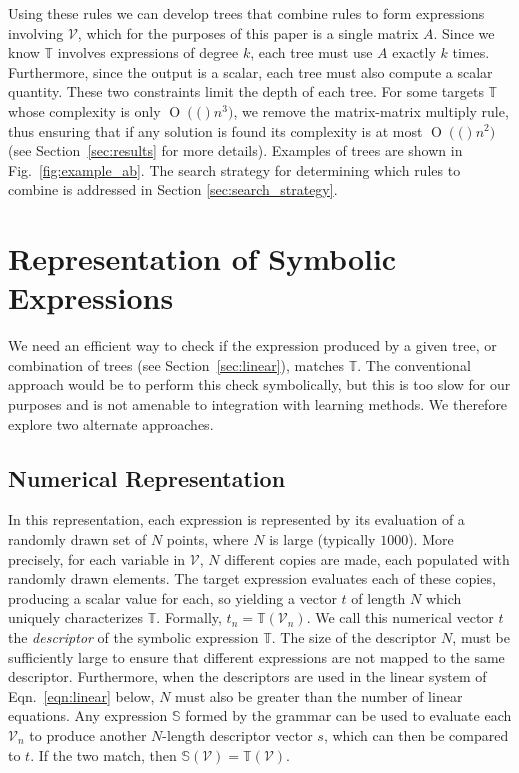 \documentclass{article} %
\newcommand{\eqn}[1]{Eqn.~\ref{eqn:#1}}
\newcommand{\fig}[1]{Fig.~\ref{fig:#1}}
\newcommand{\secc}[1]{Section~\ref{sec:#1}}
\newcommand{\BigO}[1]{\ensuremath{\operatorname{O}\left(#1\right)}}
\begin{document}
Using these rules we can develop trees that combine rules to form
expressions involving $\mathcal{V}$, which for the purposes of this
paper is a single matrix $A$. Since we know $\mathbb{T}$ involves
expressions of degree $k$, each tree must use $A$ exactly $k$
times. Furthermore, since the output is a scalar, each tree must also
compute a scalar quantity. These two constraints limit the depth of
each tree. For some targets $\mathbb{T}$ whose complexity is only
$\BigO(n^3)$, we remove the matrix-matrix multiply rule, thus ensuring
that if any solution is found its complexity is at most $\BigO(n^2)$
(see \secc{results} for more details).  Examples of trees are shown in
\fig{example_ab}. The search strategy for determining which rules to
combine is addressed in Section \ref{sec:search_strategy}.

\vspace{-0.5mm}
\section{Representation of Symbolic Expressions}
\vspace{-1mm} 
We need an efficient way to check if the expression produced
by a given tree, or combination of trees (see \secc{linear}), matches $\mathbb{T}$. 
The conventional approach would be to perform this check symbolically,
but this is too slow for our purposes and is not amenable to
integration with learning methods. We therefore explore two alternate approaches.


\vspace{-1mm} 
\subsection{Numerical Representation}
\vspace{-1mm} 
\label{sec:numerical}
In this representation, each expression is represented by its evaluation of a randomly drawn set of $N$ 
points, where $N$ is large (typically $1000$). More precisely, for each
variable in $\mathcal{V}$, $N$ different copies are made, each populated
with randomly drawn elements. The target expression evaluates each of
these copies, producing a scalar value for each, so yielding a
vector $t$ of length $N$ which uniquely characterizes
$\mathbb{T}$. Formally, $t_n = \mathbb{T}(\mathcal{V}_n)$. We call
this numerical vector $t$ the {\em descriptor} of the symbolic expression $\mathbb{T}$.
The size of the descriptor $N$, must be sufficiently large to ensure
that different expressions are not mapped to the same
descriptor. Furthermore, when the descriptors are used in the
linear system of \eqn{linear} below, $N$ must also be greater than the
number of linear equations.
Any expression $\mathbb{S}$ formed by the grammar can be used to
evaluate each $\mathcal{V}_n$ to produce another $N$-length
descriptor vector $s$,
which can then be compared to $t$. If the two match, then
$\mathbb{S}(\mathcal{V})=\mathbb{T}(\mathcal{V})$.
\end{document}
